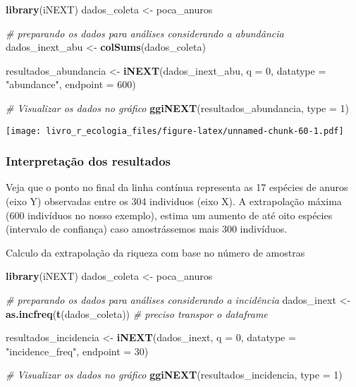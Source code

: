 \documentclass[
]{book}
\newenvironment{Shaded}{\begin{snugshade}}{\end{snugshade}}
\newcommand{\CommentTok}[1]{\textcolor[rgb]{0.56,0.35,0.01}{\textit{#1}}}
\newcommand{\DataTypeTok}[1]{\textcolor[rgb]{0.13,0.29,0.53}{#1}}
\newcommand{\DecValTok}[1]{\textcolor[rgb]{0.00,0.00,0.81}{#1}}
\newcommand{\KeywordTok}[1]{\textcolor[rgb]{0.13,0.29,0.53}{\textbf{#1}}}
\newcommand{\NormalTok}[1]{#1}
\newcommand{\StringTok}[1]{\textcolor[rgb]{0.31,0.60,0.02}{#1}}
\begin{document}
\begin{Shaded}
\begin{Highlighting}[]
\KeywordTok{library}\NormalTok{(iNEXT)}
\NormalTok{dados_coleta <-}\StringTok{ }\NormalTok{poca_anuros}

\CommentTok{# preparando os dados para análises considerando a abundância}
\NormalTok{dados_inext_abu <-}\StringTok{ }\KeywordTok{colSums}\NormalTok{(dados_coleta) }

\NormalTok{resultados_abundancia <-}\StringTok{ }\KeywordTok{iNEXT}\NormalTok{(dados_inext_abu, }\DataTypeTok{q =} \DecValTok{0}\NormalTok{, }\DataTypeTok{datatype =} \StringTok{"abundance"}\NormalTok{, }
			\DataTypeTok{endpoint =} \DecValTok{600}\NormalTok{)}

\CommentTok{# Visualizar os dados no gráfico}
\KeywordTok{ggiNEXT}\NormalTok{(resultados_abundancia, }\DataTypeTok{type =} \DecValTok{1}\NormalTok{)}
\end{Highlighting}
\end{Shaded}

\texttt{[image: livro\_r\_ecologia\_files/figure-latex/unnamed-chunk-60-1.pdf]}

\hypertarget{interpretauxe7uxe3o-dos-resultados-6}{%
\subsubsection{Interpretação dos resultados}\label{interpretauxe7uxe3o-dos-resultados-6}}

Veja que o ponto no final da linha contínua representa as 17 espécies de anuros (eixo Y) observadas entre os 304 individuos (eixo X). A extrapolação máxima (600 indivíduos no nosso exemplo), estima um aumento de até oito espécies (intervalo de confiança) caso amostrássemos mais 300 indivíduos.

Calculo da extrapolação da riqueza com base no número de amostras

\begin{Shaded}
\begin{Highlighting}[]
\KeywordTok{library}\NormalTok{(iNEXT)}
\NormalTok{dados_coleta <-}\StringTok{ }\NormalTok{poca_anuros}

\CommentTok{# preparando os dados para análises considerando a incidência}
\NormalTok{dados_inext <-}\StringTok{ }\KeywordTok{as.incfreq}\NormalTok{(}\KeywordTok{t}\NormalTok{(dados_coleta)) }\CommentTok{# preciso transpor o dataframe}

\NormalTok{resultados_incidencia <-}\StringTok{ }\KeywordTok{iNEXT}\NormalTok{(dados_inext, }\DataTypeTok{q =} \DecValTok{0}\NormalTok{, }\DataTypeTok{datatype =} \StringTok{"incidence_freq"}\NormalTok{, }
			\DataTypeTok{endpoint =} \DecValTok{30}\NormalTok{)}

\CommentTok{# Visualizar os dados no gráfico}
\KeywordTok{ggiNEXT}\NormalTok{(resultados_incidencia, }\DataTypeTok{type =} \DecValTok{1}\NormalTok{)}
\end{Highlighting}
\end{Shaded}
\end{document}

